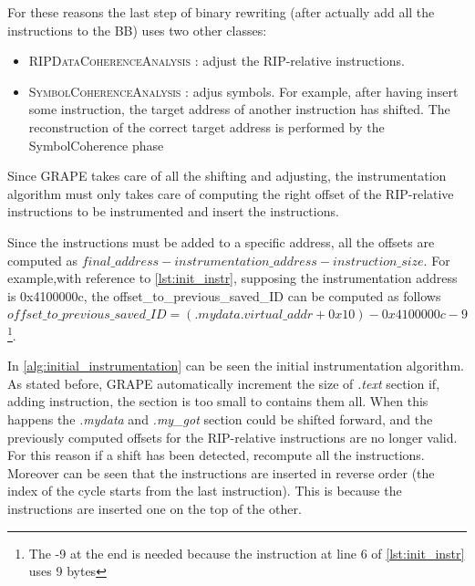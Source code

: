 For these reasons the last step of binary rewriting (after actually add all the instructions to the \gls{BB}) uses two other classes:
\begin{itemize}
    \item \textsc{RIPDataCoherenceAnalysis} : adjust the RIP-relative instructions.
    \item \textsc{SymbolCoherenceAnalysis} : adjus symbols. For example, after having insert some instruction, 
        the target address of another instruction has shifted. The reconstruction of the correct target address is
        performed by the SymbolCoherence phase
\end{itemize}
Since GRAPE takes care of all the shifting and adjusting, the instrumentation algorithm must only takes care 
of computing the right offset of the RIP-relative instructions to be instrumented and insert the instructions.

Since the instructions must be added to a specific address, all the offsets are computed as $final\_address - instrumentation\_address -instruction\_size$.
For example,with reference to \cref{lst:init_instr}, supposing the instrumentation address is 0x4100000c, the offset\_to\_previous\_saved\_ID can be computed as follows\\
$offset\_to\_previous\_saved\_ID=(\textit{.mydata}.virtual\_addr + 0x10) - 0x4100000c - 9$\footnote{
    The -9 at the end is needed because the instruction at line 6 of \cref{lst:init_instr} uses 9 bytes
}.

In \cref{alg:initial_instrumentation} can be seen the initial instrumentation algorithm.
As stated before, GRAPE automatically increment the size of \textit{.text} section if, adding instruction, 
the section is too small to contains them all.
When this happens the \textit{.mydata} and \textit{.my\_got} section could be shifted forward, and the previously computed 
offsets for the RIP-relative instructions are no longer valid. 
For this reason if a shift has been detected, recompute all the instructions.
Moreover can be seen that the instructions are inserted in reverse order (the index of the cycle starts from the last instruction).
This is because the instructions are inserted one on the top of the other.

